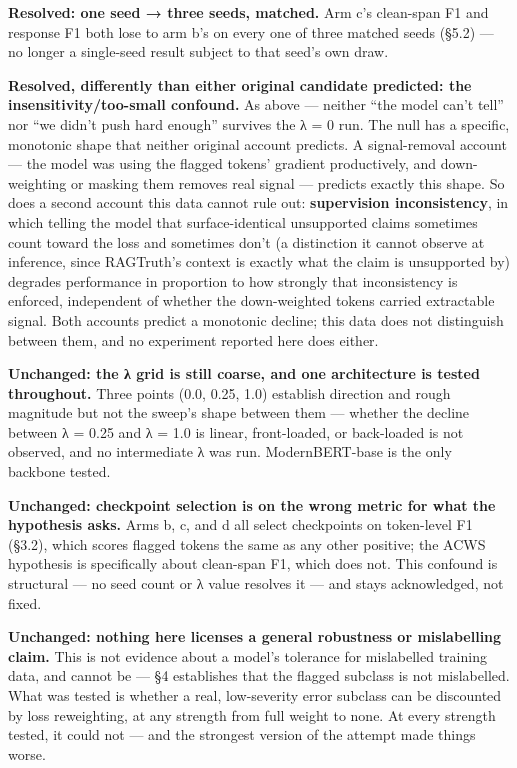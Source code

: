 \documentclass[11pt]{article}
\newcounter{none}
\begin{document}
\textbf{Resolved: one seed → three seeds, matched.} Arm c's clean-span F1 and response F1 both
lose to arm b's on every one of three matched seeds (§5.2) --- no longer a single-seed result
subject to that seed's own draw.

\textbf{Resolved, differently than either original candidate predicted: the
insensitivity/too-small confound.} As above --- neither ``the model can't tell'' nor ``we didn't
push hard enough'' survives the λ = 0 run. The null has a specific, monotonic shape that
neither original account predicts. A signal-removal account --- the model was using the
flagged tokens' gradient productively, and down-weighting or masking them removes real signal
--- predicts exactly this shape. So does a second account this data cannot rule out:
\textbf{supervision inconsistency}, in which telling the model that surface-identical unsupported
claims sometimes count toward the loss and sometimes don't (a distinction it cannot observe
at inference, since RAGTruth's context is exactly what the claim is unsupported by) degrades
performance in proportion to how strongly that inconsistency is enforced, independent of
whether the down-weighted tokens carried extractable signal. Both accounts predict a
monotonic decline; this data does not distinguish between them, and no experiment reported
here does either.

\textbf{Unchanged: the λ grid is still coarse, and one architecture is tested throughout.} Three
points (0.0, 0.25, 1.0) establish direction and rough magnitude but not the sweep's shape
between them --- whether the decline between λ = 0.25 and λ = 1.0 is linear, front-loaded, or
back-loaded is not observed, and no intermediate λ was run. ModernBERT-base is the only
backbone tested.

\textbf{Unchanged: checkpoint selection is on the wrong metric for what the hypothesis asks.}
Arms b, c, and d all select checkpoints on token-level F1 (§3.2), which scores flagged
tokens the same as any other positive; the ACWS hypothesis is specifically about clean-span
F1, which does not. This confound is structural --- no seed count or λ value resolves it --- and
stays acknowledged, not fixed.

\textbf{Unchanged: nothing here licenses a general robustness or mislabelling claim.} This is not
evidence about a model's tolerance for mislabelled training data, and cannot be --- §4
establishes that the flagged subclass is not mislabelled. What was tested is whether a real,
low-severity error subclass can be discounted by loss reweighting, at any strength from full
weight to none. At every strength tested, it could not --- and the strongest version of the
attempt made things worse.
\end{document}
